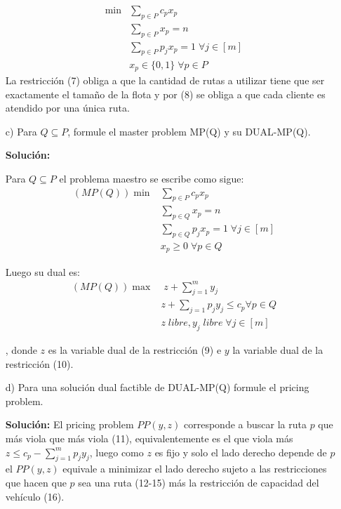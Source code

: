 \documentclass[10pt]{article}
\theoremstyle{plain}
\theoremstyle{definition}
\begin{document}
\begin{itemize}
\begin{align}
\min & \sum_{p\in P}c_{p}x_{p}\nonumber\\
& \sum_{p\in P}x_{p}=n\\
& \sum_{p\in P}p_{j}x_{p} = 1 \; \forall j \in [m]\\
& x_{p}\in\{0,1\} \; \forall p \in P\nonumber
\end{align}
La restricción (7) obliga a que la cantidad de rutas a utilizar tiene que ser exactamente el tamaño de la flota y por (8) se obliga a que cada cliente es atendido por una única ruta.

\item[c)] Para $Q\subseteq P$, formule el master problem MP(Q) y su DUAL-MP(Q).

\textbf{Solución:}

Para $Q\subseteq P$ el problema maestro se escribe como sigue:
\begin{align}
    (MP(Q))\min & \sum_{p\in P}c_{p}x_{p}\nonumber\\
    & \sum_{p\in Q}x_{p}=n\\
    & \sum_{p\in Q}p_{j}x_{p} = 1 \; \forall j \in [m]\\
    & x_{p}\geq 0 \; \forall p \in Q\nonumber
\end{align}

Luego su dual es:
\begin{align}
    (MP(Q))\max & \;z+\sum_{j=1}^{m}y_{j}\nonumber\\
    & z+\sum_{j=1}p_{j}y_{j}\leq c_{p} \forall p \in Q\\
    & z \; libre, y_{j} \; libre \;\forall j \in [m]\nonumber
\end{align}

, donde $z$ es la variable dual de la restricción (9) e $y$ la variable dual de la restricción (10).

\item[d)] Para una solución dual factible de DUAL-MP(Q) formule el pricing problem.

\textbf{Solución:}
El pricing problem $PP(y,z)$ corresponde a buscar la ruta $p$ que más viola que más viola (11), equivalentemente es el que viola más $z\leq c_{p}-\sum_{j=1}^{m}p_{j}y_{j}$, luego como $z$ es fijo y solo el lado derecho depende de $p$ el $PP(y,z)$ equivale a minimizar el lado derecho sujeto a las restricciones que hacen que $p$ sea una ruta (12-15) más la restricción de capacidad del vehículo (16).


\end{itemize}
\end{document}
